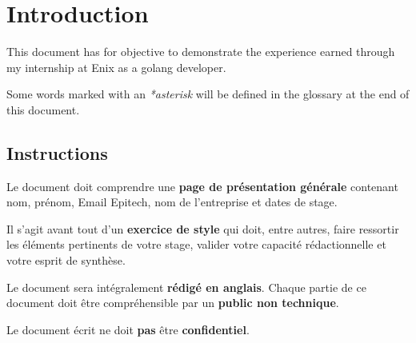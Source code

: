 \chapter{Introduction}

This document has for objective to demonstrate the experience earned through my internship at Enix as a golang developer.

Some words marked with an \emph{*asterisk} will be defined in the glossary at the end of this document.

\section{Instructions}
\color{red}
Le document doit comprendre une \textbf{page de présentation générale} contenant nom, prénom, Email Epitech, nom de l’entreprise et dates de stage.

Il s’agit avant tout d’un \textbf{exercice de style} qui doit, entre autres, faire ressortir les éléments
pertinents de votre stage, valider votre capacité rédactionnelle et votre esprit de synthèse.

Le document sera intégralement \textbf{rédigé en anglais}. Chaque partie de ce document doit être
compréhensible par un \textbf{public non technique}.

Le document écrit ne doit \textbf{pas} être \textbf{confidentiel}.
\color{black}

\clearpage
